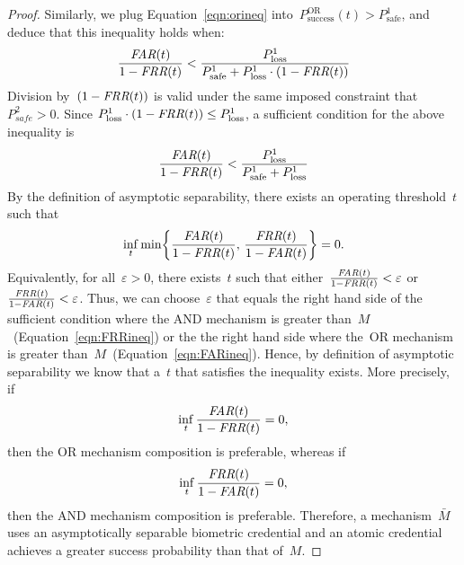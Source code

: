 \documentclass[conference,compsoc]{IEEEtran}
\begin{document}
\begin{proof}
    Similarly, we plug Equation~\ref{eqn:orineq} into~$P^{\text{OR}}_{\text{success}}(t) > P^1_{\text{safe}}$, and deduce that this inequality holds when:
    \begin{equation}\label{eqn:necessary term_2}
        \frac{\textit{FAR}(t)}{1-\textit{FRR}(t)} < \frac{P^{1}_{\text{loss}}}{P^{1}_{\text{safe}}+P^{1}_{\text{loss}}\cdot(1-\textit{FRR}(t))}
    \end{equation}
    Division by~$(1-\textit{FRR}(t))$ is valid under the same imposed constraint that~$P^{2}_\textit{safe}>0$.
    Since $P^{1}_{\text{loss}}\cdot(1-\textit{FRR}(t)) \le P^{1}_{\text{loss}}$, a sufficient condition for the above inequality is
    \begin{equation}
        \label{eqn:FARineq}
        \frac{\textit{FAR}(t)}{1-\textit{FRR}(t)} < \frac{P^{1}_{\text{loss}}}{P^{1}_{\text{safe}}+P^{1}_{\text{loss}}}
    \end{equation}
    By the definition of asymptotic separability, there exists an operating threshold~$t$ such that 
    \begin{equation*}
    \inf_{t}
    \min\!\left\{
    \frac{\textit{FAR}(t)}{1-\textit{FRR}(t)},\,
    \frac{\textit{FRR}(t)}{1-\textit{FAR}(t)}
    \right\}
    = 0.
    \end{equation*}
    Equivalently, for all~$\varepsilon > 0$, there exists~$t$ such that either~$\frac{\textit{FAR}(t)}{1-\textit{FRR}(t)} < \varepsilon$ or~$\frac{\textit{FRR}(t)}{1-\textit{FAR}(t)} < \varepsilon$. Thus, we can choose~$\varepsilon$ that equals the right hand side of the sufficient condition where the \textsc{AND} mechanism is greater than~$M$~(Equation~\ref{eqn:FRRineq}) or the the right hand side where the~\textsc{OR} mechanism is greater than~$M$~(Equation~\ref{eqn:FARineq}). Hence, by definition of asymptotic separability we know that a~$t$ that satisfies the inequality exists. 
    More precisely, if \[\inf_{t}\frac{\textit{FAR}(t)}{1-\textit{FRR}(t)} = 0,\] 
    then the \textsc{OR} mechanism composition is preferable, whereas if \[\inf_{t}\frac{\textit{FRR}(t)}{1-\textit{FAR}(t)} = 0,\] then the \textsc{AND} mechanism composition is preferable. Therefore, a mechanism~$\bar{M}$ uses an asymptotically separable biometric credential and an atomic credential achieves a greater success probability than that of~$M$.
\end{proof}
\end{document}
